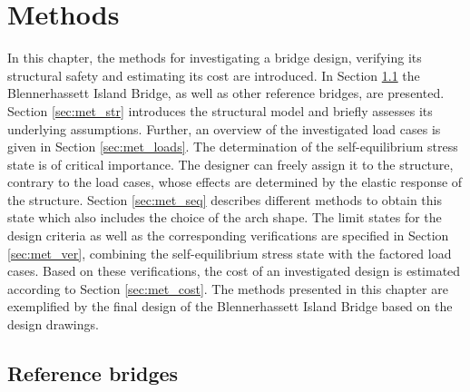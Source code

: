 \chapter{Methods}\label{sec:methods}
In this chapter, the methods for investigating a bridge design, verifying its structural safety and estimating its cost are introduced. In Section \ref{sec:met_ref} the Blennerhassett Island Bridge, as well as other reference bridges, are presented.
Section \ref{sec:met_str} introduces the structural model and briefly assesses its underlying assumptions. Further, an overview of the investigated load cases is given in Section \ref{sec:met_loads}. The determination of the self-equilibrium stress state is of critical importance. The designer can freely assign it to the structure, contrary to the load cases, whose effects are determined by the elastic response of the structure. Section \ref{sec:met_seq} describes different methods to obtain this state which also includes the choice of the arch shape. The limit states for the design criteria as well as the corresponding verifications are specified in Section \ref{sec:met_ver}, combining the self-equilibrium stress state with the factored load cases. Based on these verifications, the cost of an investigated design is estimated according to Section \ref{sec:met_cost}. The methods presented in this chapter are exemplified by the final design of the Blennerhassett Island Bridge based on the design drawings.

\section{Reference bridges} \label{sec:met_ref}

\newpage
